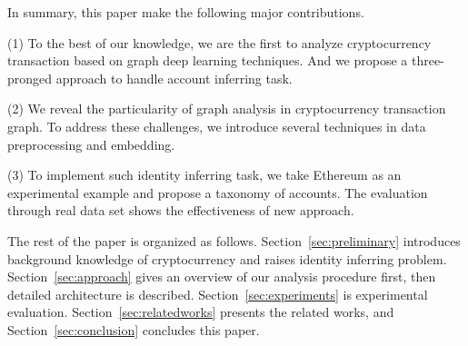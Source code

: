 In summary, this paper make the following major contributions.

(1) To the best of our knowledge, we are the first to analyze cryptocurrency transaction based on graph deep learning techniques. And we propose a three-pronged approach to handle account inferring task.

(2) We reveal the particularity of graph analysis in cryptocurrency transaction graph. To address these challenges, we introduce several techniques in data preprocessing and embedding.

(3) To implement such identity inferring task, we take Ethereum as an experimental example and propose a taxonomy of accounts. The evaluation through real data set shows the effectiveness of new approach.




The rest of the paper is organized as follows. Section~\ref{sec:preliminary} introduces background knowledge of cryptocurrency and raises identity inferring problem. Section~\ref{sec:approach} gives an overview of our analysis procedure first, then detailed architecture is described. Section~\ref{sec:experiments} is experimental evaluation. Section~\ref{sec:relatedworks} presents the related works, and Section~\ref{sec:conclusion} concludes this paper.




